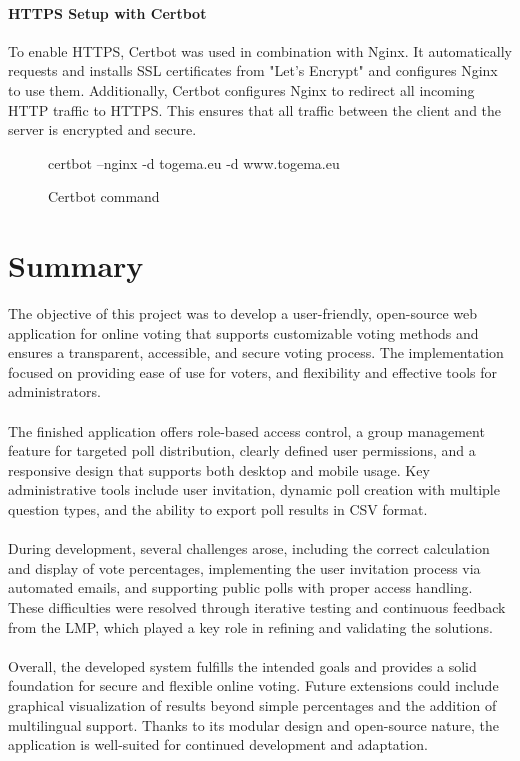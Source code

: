\documentclass[a4paper,12pt]{report}
\begin{document}
\subsubsection{HTTPS Setup with Certbot}
To enable HTTPS, Certbot was used in combination with Nginx. It automatically requests and installs SSL certificates from "Let’s Encrypt" and configures Nginx to use them. Additionally, Certbot configures Nginx to redirect all incoming HTTP traffic to HTTPS. This ensures that all traffic between the client and the server is encrypted and secure.
\begin{figure}[H]
	\begin{terminal}
		certbot --nginx -d togema.eu -d www.togema.eu
	\end{terminal}
	\caption{Certbot command}
\end{figure}

\chapter{Summary}
The objective of this project was to develop a user-friendly, open-source web application for online voting that supports customizable voting methods and ensures a transparent, accessible, and secure voting process. The implementation focused on providing ease of use for voters, and flexibility and effective tools for administrators. \\\\
The finished application offers role-based access control, a group management feature for targeted poll distribution, clearly defined user permissions, and a responsive design that supports both desktop and mobile usage. Key administrative tools include user invitation, dynamic poll creation with multiple question types, and the ability to export poll results in CSV format. \\\\
During development, several challenges arose, including the correct calculation and display of vote percentages, implementing the user invitation process via automated emails, and supporting public polls with proper access handling. These difficulties were resolved through iterative testing and continuous feedback from the LMP, which played a key role in refining and validating the solutions. \\\\
Overall, the developed system fulfills the intended goals and provides a solid foundation for secure and flexible online voting. Future extensions could include graphical visualization of results beyond simple percentages and the addition of multilingual support. Thanks to its modular design and open-source nature, the application is well-suited for continued development and adaptation.


\cleardoublepage
{}
\printbibliography

\cleardoublepage
{}
\listoffigures
\end{document}
